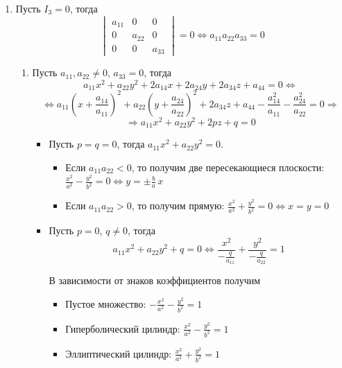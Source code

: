 \begin{enumerate}
	\item Пусть $I_3 = 0$, тогда
	\begin{equation*}
	\begin{vmatrix}
	a_{11} & 0 & 0 \\
	0 & a_{22} & 0 \\
	0 & 0 & a_{33}
	\end{vmatrix} = 0 \Leftrightarrow
	a_{11} a_{22} a_{33} = 0
	\end{equation*}
	\begin{enumerate}
		\item Пусть $a_{11}, a_{22} \neq 0$, $a_{33} = 0$, тогда
		\begin{equation*}
		a_{11} x^2 + a_{22} y^2 + 2 a_{14} x + 2 a_{24} y + 2 a_{34} z + a_{44} = 0 \Leftrightarrow
		\end{equation*}
		\begin{equation*}
		\Leftrightarrow a_{11} \left(x + \frac{a_{14}}{a_{11}}\right)^2 + a_{22} \left(y + \frac{a_{24}}{a_{22}}\right)^2 + 2 a_{34} z + a_{44} - \frac{a_{14}^2}{a_{11}} - \frac{a_{24}^2}{a_{22}} = 0 \Rightarrow
		\end{equation*}
		\begin{equation*}
		\Rightarrow a_{11} x^2 + a_{22} y^2 + 2 p z + q = 0
		\end{equation*}
		\begin{itemize}
			\item Пусть $p = q = 0$, тогда $a_{11} x^2 + a_{22} y^2 = 0$.
			\begin{itemize}
				\item Если $a_{11} a_{22} < 0$, то получим две пересекающиеся плоскости:
				$\displaystyle \frac{x^2}{a^2} - \frac{y^2}{b^2} = 0 \Leftrightarrow
				y = \pm\frac{b}a\,x$
				\item Если $a_{11} a_{22} > 0$, то получим прямую:
				$\displaystyle \frac{x^2}{a^2} + \frac{y^2}{b^2} = 0 \Leftrightarrow
				x = y = 0$
			\end{itemize}
			
			\item Пусть $p = 0$, $q \neq 0$, тогда
			\begin{equation*}
			a_{11} x^2 + a_{22} y^2 + q = 0 \Leftrightarrow
			\frac{x^2}{-\frac{q}{a_{11}}} + \frac{y^2}{-\frac{q}{a_{22}}} = 1
			\end{equation*}
			
			В зависимости от знаков коэффициентов получим
			\begin{itemize}
				\item Пустое множество:
				$\displaystyle -\frac{x^2}{a^2} - \frac{y^2}{b^2} = 1$
				\item Гиперболический цилиндр:
				$\displaystyle \frac{x^2}{a^2} - \frac{y^2}{b^2} = 1$
				\item Эллиптический цилиндр:
				$\displaystyle \frac{x^2}{a^2} + \frac{y^2}{b^2} = 1$
			\end{itemize}
			

\end{itemize}
\end{enumerate}
\end{enumerate}
